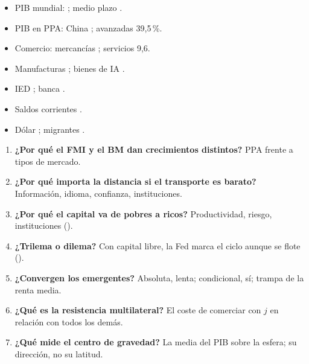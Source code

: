 \documentclass{article}
\begin{document}
\begin{columnas}
\anexorepaso
{}
\begin{itemize}
\item PIB mundial: ; medio plazo .
\item PIB en PPA: China ; avanzadas 39,5\,\%.
\item Comercio: mercancías ; servicios 9,6.
\item Manufacturas ; bienes de IA .
\item IED ; banca .
\item Saldos corrientes .
\item Dólar ; migrantes .
\end{itemize}
\begin{enumerate}
\item \textbf{¿Por qué el FMI y el BM dan crecimientos distintos?} PPA frente a tipos de mercado.
\item \textbf{¿Por qué importa la distancia si el transporte es barato?} Información, idioma, confianza, instituciones.
\item \textbf{¿Por qué el capital va de pobres a ricos?} Productividad, riesgo, instituciones ().
\item \textbf{¿Trilema o dilema?} Con capital libre, la Fed marca el ciclo aunque se flote ().
\item \textbf{¿Convergen los emergentes?} Absoluta, lenta; condicional, sí; trampa de la renta media.
\item \textbf{¿Qué es la resistencia multilateral?} El coste de comerciar con $j$ en relación con todos los demás.
\item \textbf{¿Qué mide el centro de gravedad?} La media del PIB sobre la esfera; su dirección, no su latitud.

\end{enumerate}
\end{columnas}
\end{document}
